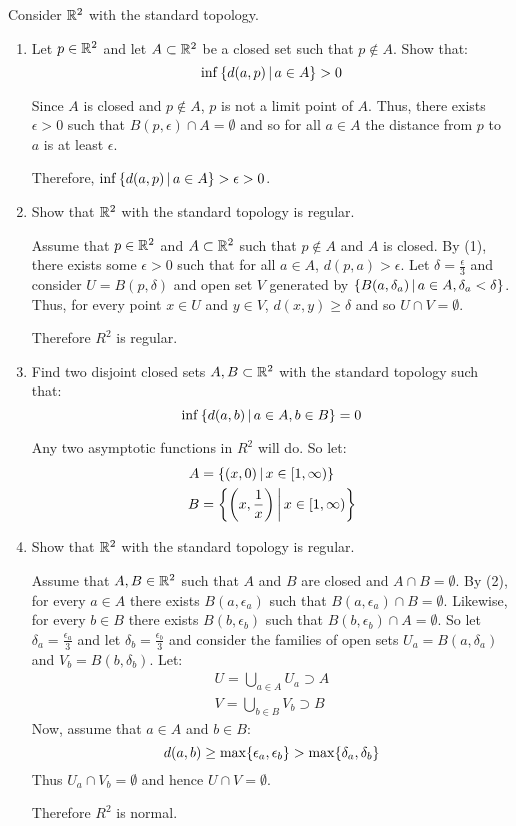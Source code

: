 \documentclass[letterpaper,12pt,fleqn]{article}
\newcommand{\e}{\epsilon}
\renewcommand{\d}{\delta}
\begin{document}
\begin{example}[Exercise 4.6]
  Consider \(\mathbb{R}^2\) with the standard topology.

  \begin{enumerate}
  \item Let \(p\in\mathbb{R}^2\) and let \(A\subset\mathbb{R}^2\) be a closed set such that \(p\notin A\).  Show that:
    \[\inf\left\{{d(a,p)}\,\middle|\,{a\in A}\right\}>0\]

    Since \(A\) is closed and \(p\notin A\), \(p\) is not a limit point of \(A\).  Thus, there exists \(\e>0\) such
    that \(B(p,\e)\cap A=\emptyset\) and so for all \(a\in A\) the distance from \(p\) to \(a\) is at least \(\e\).

    Therefore, \(\inf\setb{d(a,p)}{a\in A}>\e>0\).

  \item Show that \(\mathbb{R}^2\) with the standard topology is regular.

    Assume that \(p\in\mathbb{R}^2\) and \(A\subset\mathbb{R}^2\) such that \(p\notin A\) and \(A\) is closed.  By (1), there
    exists some \(\e>0\) such that for all \(a\in A\), \(d(p,a)>\e\).  Let \(\d=\frac{\e}{3}\) and consider
    \(U=B(p,\d)\) and open set \(V\) generated by \(\setb{B(a,\d_a)}{a\in A,\d_a<\d}\).  Thus, for every point
    \(x\in U\) and \(y\in V\), \(d(x,y)\ge\d\) and so \(U\cap V=\emptyset\).

    Therefore \(R^2\) is regular.

  \item Find two disjoint closed sets \(A,B\subset\mathbb{R}^2\) with the standard topology such that:
    \[\inf\left\{{d(a,b)}\,\middle|\,{a\in A,b\in B}\right\}=0\]

    Any two asymptotic functions in \(R^2\) will do.  So let:
    \begin{align*}
      A &= \left\{{(x,0)}\,\middle|\,{x\in[1,\infty)}\right\} \\
      B &= \left\{{\left(x,\frac{1}{x}\right)}\,\middle|\,{x\in[1,\infty)}\right\}
    \end{align*}

  \item Show that \(\mathbb{R}^2\) with the standard topology is regular.

    Assume that \(A,B\in\mathbb{R}^2\) such that \(A\) and \(B\) are closed and \(A\cap B=\emptyset\).  By (2), for every
    \(a\in A\) there exists \(B(a,\e_a)\) such that \(B(a,\e_a)\cap B=\emptyset\).  Likewise, for every \(b\in B\)
    there exists \(B(b,\e_b)\) such that \(B(b,\e_b)\cap A=\emptyset\).  So let \(\d_a=\frac{\e_a}{3}\) and let
    \(\d_b=\frac{\e_b}{3}\) and consider the families of open sets \(U_a=B(a,\d_a)\) and \(V_b=B(b,\d_b)\).  Let:
    \begin{align*}
      U=\bigcup_{a\in A}U_a\supset A \\
      V=\bigcup_{b\in B}V_b\supset B
    \end{align*}
    Now, assume that \(a\in A\) and \(b\in B\):
    \[d(a,b)\ge\max\set{\e_a,\e_b}>\max\set{\d_a,\d_b}\]
    Thus \(U_a\cap V_b=\emptyset\) and hence \(U\cap V=\emptyset\).

    Therefore \(R^2\) is normal.
  \end{enumerate}
\end{example}
\end{document}
